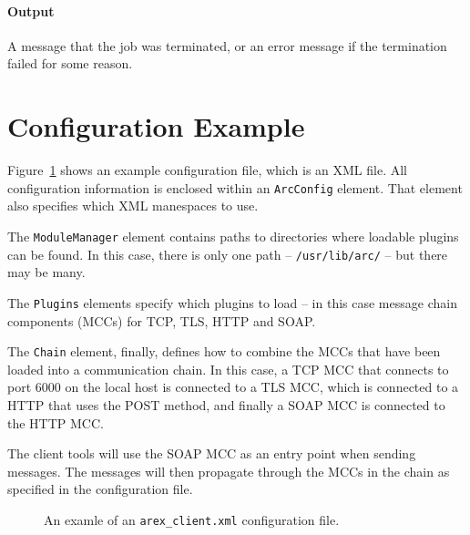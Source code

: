 \documentclass{article}                            %
\begin{document}
\paragraph{Output} A message that the job was terminated, or an error
message if the termination failed for some reason.


\appendix





\section{Configuration Example}
\label{app:config}
Figure~\ref{fig:config} shows an example configuration file, which is
an XML file. All configuration information is enclosed within an
\verb:ArcConfig: element. That element also specifies which XML
manespaces to use.

The \verb:ModuleManager: element contains paths to directories where
loadable plugins can be found. In this case, there is only one path --
\verb:/usr/lib/arc/: -- but there may be many.

The \verb:Plugins: elements specify which plugins to load -- in this
case message chain components (MCCs) for TCP, TLS, HTTP and SOAP.

The \verb:Chain: element, finally, defines how to combine the MCCs
that have been loaded into a communication chain. In this case, a TCP
MCC that connects to port 6000 on the local host is connected to a TLS
MCC, which is connected to a HTTP that uses the POST method, and
finally a SOAP MCC is connected to the HTTP MCC.

The client tools will use the SOAP MCC as an entry point when sending
messages. The messages will then propagate through the MCCs in the
chain as specified in the configuration file.

\begin{figure}
\begin{shaded}

\end{shaded}
\caption{An examle of an \texttt{arex\_client.xml} configuration file.}
\label{fig:config}
\end{figure}


\clearpage

\end{document}
